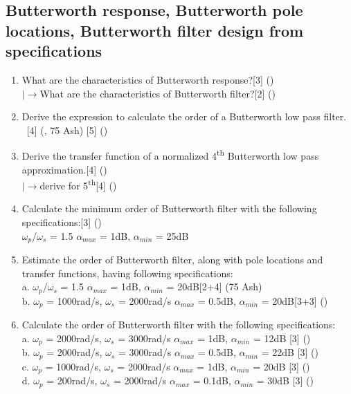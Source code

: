 \documentclass[12pt]{article}
\newcommand{\w}{\(\omega\)}
\newcommand{\lb}{\\$\left|\rightarrow\right.$}
\newcommand{\enter}{\\\textcolor{white}{1}}
\begin{document}
\subsection{Butterworth response, Butterworth pole locations, Butterworth filter design from specifications}
\begin{enumerate}
\item What are the characteristics of Butterworth response?\hfill[3] ()
\lb What are the characteristics of Butterworth filter?\hfill[2] ()

\item Derive the expression to calculate the order of a Butterworth low pass filter.
\enter \hfill[4] (, 75 Ash) [5] ()

\item Derive the transfer function of a normalized 4\textsuperscript{th} Butterworth low pass approximation.\hfill[4] ()
\lb derive for 5\textsuperscript{th}\hfill[4] ()

\item Calculate the minimum order of Butterworth filter with the following specifications:\hfill[3] ()\\
\w$_p$/\w$_s$ = 1.5 \hspace{6.7cm}
$\alpha_{max}$ = 1dB, $\alpha_{min}$ = 25dB

\item Estimate the order of Butterworth filter, along with pole locations and transfer functions, having following specifications: \\
a. \w$_p$/\w$_s$ = 1.5 \hspace{5.2cm} $\alpha_{max}$ = 1dB, $\alpha_{min}$ = 20dB\hfill[2+4] (75 Ash)\\
b. \w$_p$ = 1000rad/s, \w$_s$ = 2000rad/s \hspace{1.5cm}
$\alpha_{max}$ = 0.5dB, $\alpha_{min}$ = 20dB\hfill[3+3] ()

\item Calculate the order of Butterworth filter with the following specifications:\\
a. \w$_p$ = 2000rad/s, \w$_s$ = 3000rad/s \hspace{3cm}
$\alpha_{max}$ = 1dB, $\alpha_{min}$ = 12dB \hfill[3] ()\\
b. \w$_p$ = 2000rad/s, \w$_s$ = 3000rad/s \hspace{3cm}
$\alpha_{max}$ = 0.5dB, $\alpha_{min}$ = 22dB \hfill[3] ()\\
c. \w$_p$ = 1000rad/s, \w$_s$ = 2000rad/s \hspace{3cm}
$\alpha_{max}$ = 1dB, $\alpha_{min}$ = 20dB \hfill[3] ()\\
d. \w$_p$ = 200rad/s, \w$_s$ = 2000rad/s \hspace{3.2cm}
$\alpha_{max}$ = 0.1dB, $\alpha_{min}$ = 30dB \hfill[3] ()
\end{enumerate}
\end{document}
